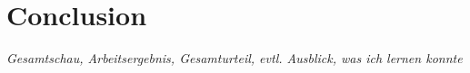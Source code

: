 \chapter{Conclusion}
\label{cha:Conclusion}
\textit{Gesamtschau, Arbeitsergebnis, Gesamturteil, evtl. Ausblick, was ich lernen konnte}